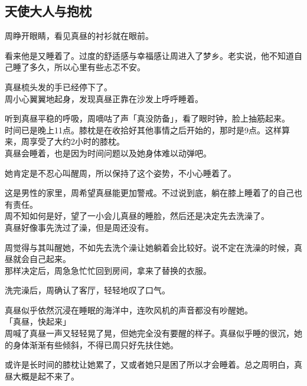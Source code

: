 \subsection{天使大人与抱枕}

周睁开眼睛，看见真昼的衬衫就在眼前。

看来他是又睡着了。过度的舒适感与幸福感让周进入了梦乡。老实说，他不知道自己睡了多久，所以心里有些忐忑不安。

真昼梳头发的手已经停下了。\\

周小心翼翼地起身，发现真昼正靠在沙发上呼呼睡着。

听到真昼平稳的呼吸，周嘀咕了声「真没防备」，看了眼时钟，脸上抽筋起来。\\

时间已是晚上11点。膝枕是在收拾好其他事情之后开始的，那时是9点。这样算来，周享受了大约2小时的膝枕。\\

真昼会睡着，也是因为时间问题以及她身体难以动弹吧。

她肯定是不忍心叫醒周，所以保持了这个姿势，不小心睡着了。

这是男性的家里，周希望真昼能更加警戒。不过说到底，躺在膝上睡着了的自己也有责任。\\

周不知如何是好，望了一小会儿真昼的睡脸，然后还是决定先去洗澡了。\\

真昼好像事先洗过了澡，但是周还没有。

周觉得与其叫醒她，不如先去洗个澡让她躺着会比较好。说不定在洗澡的时候，真昼就会自己起来。\\

那样决定后，周急急忙忙回到房间，拿来了替换的衣服。\\

\vspace{2\baselineskip}

洗完澡后，周确认了客厅，轻轻地叹了口气。

真昼似乎依然沉浸在睡眠的海洋中，连吹风机的声音都没有吵醒她。\\

「真昼，快起来」\\

周喊了真昼一声又轻轻晃了晃，但她完全没有要醒的样子。真昼似乎睡的很沉，她的身体渐渐有些倾斜，不得已周只好先扶住她。

或许是长时间的膝枕让她累了，又或者她只是困了所以才会睡着。总之周明白，真昼大概是起不来了。\\

